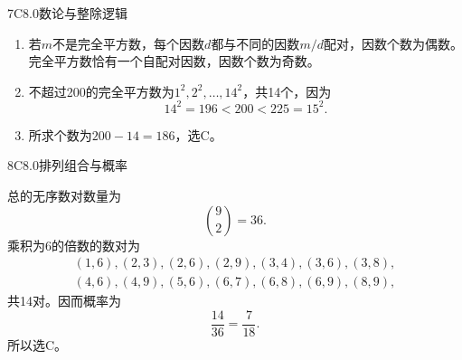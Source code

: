 \begin{solution}{7}{C}{8.0}{数论与整除逻辑}
\begin{enumerate}[label=\textbf{Step \arabic*:},leftmargin=*]
  \item 若\(m\)不是完全平方数，每个因数\(d\)都与不同的因数\(m/d\)配对，因数个数为偶数。完全平方数恰有一个自配对因数，因数个数为奇数。
  \item 不超过200的完全平方数为\(1^2,2^2,\ldots,14^2\)，共14个，因为
  \[
    14^2=196<200<225=15^2.
  \]
  \item 所求个数为\(200-14=186\)，选C。
\end{enumerate}
\end{solution}

\begin{solution}{8}{C}{8.0}{排列组合与概率}

总的无序数对数量为
\[
  \binom92=36.
\]
乘积为6的倍数的数对为
\[
\begin{gathered}
  (1,6),(2,3),(2,6),(2,9),(3,4),(3,6),(3,8),\\
  (4,6),(4,9),(5,6),(6,7),(6,8),(6,9),(8,9),
\end{gathered}
\]
共14对。因而概率为
\[
  \frac{14}{36}=\frac7{18}.
\]
所以选C。

\end{solution}

